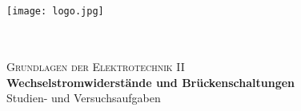\documentclass[12pt]{article}
\begin{document}
\begin{titlepage}

\newcommand{\HRule}{\rule{\linewidth}{0.5mm}} %

\center %



\noindent\begin{minipage}[t][0.3819660112501052\paperheight][t]{\textwidth}
\centering
\vspace{0.09016994374947421\paperheight}
\texttt{[image: logo.jpg]}
\end{minipage}

\begin{tabular}{C}



\end{tabular}\\
\textsc{\Large Grundlagen der Elektrotechnik II}\\[0.5cm] %


{ \huge \bfseries Wechselstromwiderstände und Brückenschaltungen}\\ %
\vspace{0.034441853748633004\paperheight}
\large Studien- und Versuchsaufgaben\\
\vspace{0.1458980337503154\paperheight}


\end{titlepage}
\end{document}
